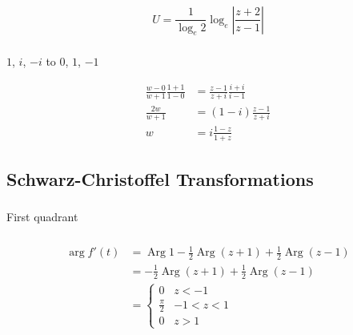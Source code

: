 \documentclass{article}
\newcommand{\Arg}{\operatorname{Arg}}
\begin{document}
\setcounter{subsubsection}{16}
\subsubsection{}

\[U = \frac{1}{\log_e 2} \log_e \left| \frac{z + 2}{z - 1} \right|\]

\setcounter{subsubsection}{18}
\subsubsection{}

$1$, $i$, $-i$ to $0$, $1$, $-1$

\begin{align*}
  \frac{w - 0}{w + 1} \frac{1 + 1}{1 - 0} & = \frac{z - 1}{z + i} \frac{i + i}{i - 1} \\
  \frac{2 w}{w + 1}                       & = (1 - i) \frac{z - 1}{z + i}             \\
  w                                       & = i \frac{1 - z}{1 + z}
\end{align*}

\subsection{Schwarz-Christoffel Transformations}

\subsubsection{}

First quadrant

\setcounter{subsubsection}{2}
\subsubsection{}

\begin{align*}
  \arg f'(t) & = \Arg 1 - \frac{1}{2} \Arg (z + 1) + \frac{1}{2} \Arg (z - 1) \\
             & = -\frac{1}{2} \Arg (z + 1) + \frac{1}{2} \Arg (z - 1)         \\
             & = \begin{cases}
                   0             & z < -1     \\
                   \frac{\pi}{2} & -1 < z < 1 \\
                   0             & z > 1
                 \end{cases}
\end{align*}
\end{document}
